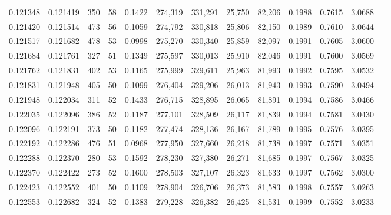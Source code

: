\begin{tabular}{rrrrrrrrrrrrr}
0.121348 & 0.121419 &   350 &  58 &                                     0.1422 & 274,319 & 331,291 &  25,750 &  82,206 & 0.1988 & 0.7615 & 3.0688 \\
0.121420 & 0.121514 &   473 &  56 &                                     0.1059 & 274,792 & 330,818 &  25,806 &  82,150 & 0.1989 & 0.7610 & 3.0644 \\
0.121517 & 0.121682 &   478 &  53 &                                     0.0998 & 275,270 & 330,340 &  25,859 &  82,097 & 0.1991 & 0.7605 & 3.0600 \\
0.121684 & 0.121761 &   327 &  51 &                                     0.1349 & 275,597 & 330,013 &  25,910 &  82,046 & 0.1991 & 0.7600 & 3.0569 \\
0.121762 & 0.121831 &   402 &  53 &                                     0.1165 & 275,999 & 329,611 &  25,963 &  81,993 & 0.1992 & 0.7595 & 3.0532 \\
0.121831 & 0.121948 &   405 &  50 &                                     0.1099 & 276,404 & 329,206 &  26,013 &  81,943 & 0.1993 & 0.7590 & 3.0494 \\
0.121948 & 0.122034 &   311 &  52 &                                     0.1433 & 276,715 & 328,895 &  26,065 &  81,891 & 0.1994 & 0.7586 & 3.0466 \\
0.122035 & 0.122096 &   386 &  52 &                                     0.1187 & 277,101 & 328,509 &  26,117 &  81,839 & 0.1994 & 0.7581 & 3.0430 \\
0.122096 & 0.122191 &   373 &  50 &                                     0.1182 & 277,474 & 328,136 &  26,167 &  81,789 & 0.1995 & 0.7576 & 3.0395 \\
0.122192 & 0.122286 &   476 &  51 &                                     0.0968 & 277,950 & 327,660 &  26,218 &  81,738 & 0.1997 & 0.7571 & 3.0351 \\
0.122288 & 0.122370 &   280 &  53 &                                     0.1592 & 278,230 & 327,380 &  26,271 &  81,685 & 0.1997 & 0.7567 & 3.0325 \\
0.122370 & 0.122422 &   273 &  52 &                                     0.1600 & 278,503 & 327,107 &  26,323 &  81,633 & 0.1997 & 0.7562 & 3.0300 \\
0.122423 & 0.122552 &   401 &  50 &                                     0.1109 & 278,904 & 326,706 &  26,373 &  81,583 & 0.1998 & 0.7557 & 3.0263 \\
0.122553 & 0.122682 &   324 &  52 &                                     0.1383 & 279,228 & 326,382 &  26,425 &  81,531 & 0.1999 & 0.7552 & 3.0233 \\

\end{tabular}
